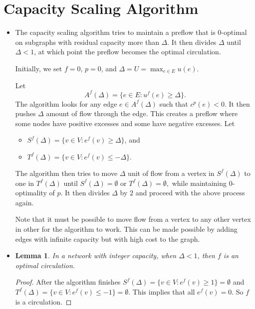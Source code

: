\documentclass[10pt]{article}
\newtheorem{lemma}{Lemma}[section]
\begin{document}
  \section{Capacity Scaling Algorithm} %
  \label{sec:capacity_scaling_algorithm}
    \begin{itemize}
      \item The capacity scaling algorithm tries to maintain a preflow
        that is $0$-optimal on subgraphs with residual capacity more than
        $\Delta$. It then divides $\Delta$ until $\Delta < 1$, at which point
        the preflow becomes the optimal circulation.
        
        Initially, we set $f = 0$, $p = 0$, and $\Delta = U = \max_{e \in E} u(e).$
       
        Let $$A^f(\Delta) = \{ e \in E : u^f(e) \geq \Delta \}.$$
        The algorithm looks for any edge $e \in A^f(\Delta)$ such 
        that $c^p(e) < 0.$ It then pushes $\Delta$ amount of flow through
        the edge. This creates a preflow where some nodes have positive
        excesses and some have negative excesses. Let
        \begin{itemize}
          \item $S^f(\Delta) = \{ v \in V : e^f(v) \geq \Delta \}$, and
          \item $T^f(\Delta) = \{ v \in V : e^f(v) \leq -\Delta \}.$
        \end{itemize}
        The algorithm then tries to move $\Delta$ unit of flow from
        a vertex in $S^f(\Delta)$ to one in $T^f(\Delta)$ until
        $S^f(\Delta) = \emptyset$ or $T^f(\Delta) = \emptyset,$
        while maintaining $0$-optimality of $p$. It then divides $\Delta$
        by $2$ and proceed with the above process again.
        
        Note that it must be possible to move flow from a 
        vertex to any other vertex in other for the algorithm to
        work. This can be made possible by adding edges with infinite
        capacity but with high cost to the graph.
      \item 
        \begin{lemma}
          In a network with integer capacity, when $\Delta < 1$, 
          then $f$ is an optimal circulation.
        \end{lemma}
        \begin{proof}
          After the algorithm finishes $S^f(\Delta) = \{ v \in V : e^f(v) \geq 1 \} = \emptyset$
          and $T^f(\Delta) = \{ v \in V : e^f(v) \leq -1 \} = \emptyset$.
          This implies that all $e^f(v) = 0$. So $f$ is a circulation.
          

\end{proof}
\end{itemize}
\end{document}
